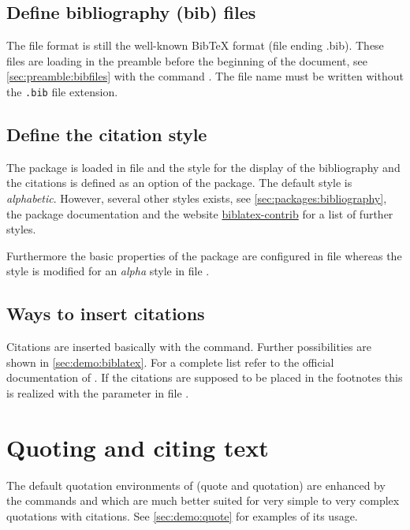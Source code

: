 \subsection{Define bibliography (bib) files}
The file format is still the well-known BibTeX format (file ending .bib). These files are loading in the preamble before the beginning of the document, see \cref{sec:preamble:bibfiles} with the command . The file name must be written without the \texttt{.bib} file extension.

\subsection{Define the citation style}
The package is loaded in file  and the style for the display of the bibliography and the citations is defined as an option of the package. The default style is \emph{alphabetic}. However, several other styles exists, see \cref{sec:packages:bibliography}, the package documentation and the website \href{http://www.ctan.org/tex-archive/macros/latex/exptl/biblatex-contrib}{biblatex-contrib} for a list of further styles. 

Furthermore the basic properties of the package are configured in file  whereas the style is modified for an \emph{alpha} style in file .

\subsection{Ways to insert citations}

Citations are inserted basically with the  command. Further possibilities are shown in \cref{sec:demo:biblatex}. For a complete list refer to the official documentation of . If the citations are supposed to be placed in the footnotes this is realized with the parameter  in file 
.

\section{Quoting and citing text}
\label{sec:doc:faq:quotes}
The default quotation environments of \latex (quote and quotation) are enhanced by the commands  and  which are much better suited for very simple to very complex quotations with citations.
See \cref{sec:demo:quote} for examples of its usage.

